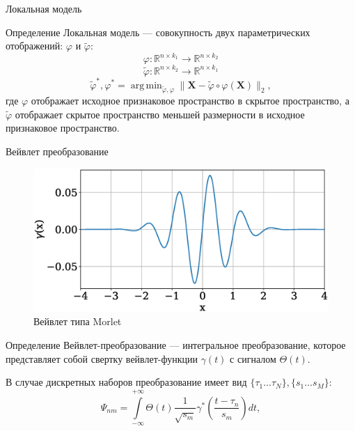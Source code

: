 \documentclass[9pt,pdf,hyperref={unicode}]{beamer}
\renewcommand{\phi}{\varphi}
\DeclareMathOperator*{\argmin}{arg\,min}
\begin{document}
\begin{frame}{Локальная модель}
\begin{block}{Определение}
	Локальная модель --- совокупность двух параметрических отображений: $\varphi$ и $\tilde{\varphi}$:
	\[
	\phi: \mathbb{R}^{n \times k_1} \rightarrow \mathbb{R}^{n \times k_2}
	\]
	\[
	\tilde{\phi}: \mathbb{R}^{n \times k_2} \rightarrow \mathbb{R}^{n \times k_1}
	\]
	\[
	\tilde{\varphi}^*, \phi^* = \argmin_{\tilde{\phi}, \phi} \|\mathbf{X} - \tilde{\phi} \circ \phi (\mathbf{X}) \|_2,
	\]	 
	где 
	$\phi$ отображает исходное признаковое пространство в скрытое пространство, а $\tilde{\phi}$ отображает скрытое пространство меньшей размерности в исходное признаковое пространство.
\end{block}
\end{frame}
\begin{frame}{Вейвлет преобразование}
\begin{figure}
	\includegraphics[width=0.6\linewidth]{figs/morl.eps}
	\caption{Вейвлет типа Morlet}
\end{figure}
\begin{block}{Определение}
	Вейвлет-преобразование --- интегральное преобразование, которое представляет собой свертку вейвлет-функции $\gamma(t)$ с сигналом $\Theta(t)$.
	
В случае дискретных наборов преобразование имеет вид $\{\tau_1 \ldots \tau_N\}, \{s_1 \ldots s_M \}$:
\[
\Psi_{nm} = \int \limits _{{-\infty }}^{{+\infty }}\Theta(t){\frac  {1}{{\sqrt  {s_m}}}}\gamma ^{{*}}\left({\frac  {t-\tau_n }{s_m}}\right)dt,	
\]
\end{block}
\end{frame}
\end{document}
